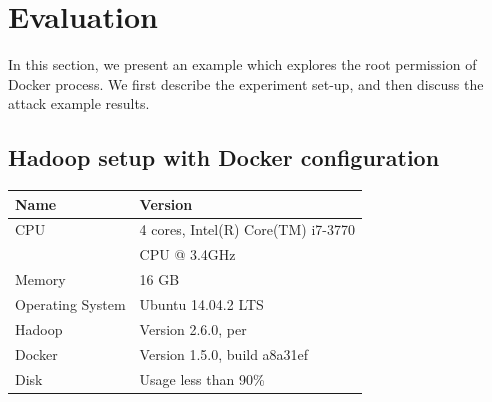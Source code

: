 \section{Evaluation}
\label{sec:eval}

In this section, we present an example which explores the root permission of Docker process. We first describe the experiment set-up, and then discuss the attack example results.

\subsection{Hadoop setup with Docker configuration}
\begin{table}[ht]
\begin{tabular}{|l|l|}
\hline 
Name & Version \\ 
\hline 
CPU & 4 cores, Intel(R) Core(TM) i7-3770 \\
& CPU @ 3.4GHz \\ 
\hline 
Memory & 16 GB \\ 
\hline 
Operating System & Ubuntu 14.04.2 LTS \\ 
\hline 
Hadoop & Version 2.6.0, per \\ 
\hline 
Docker & Version 1.5.0, build a8a31ef \\ 
\hline 
Disk & Usage less than 90\% \\ 
\hline 
\end{tabular}
\label{experiment}
\end{table}

